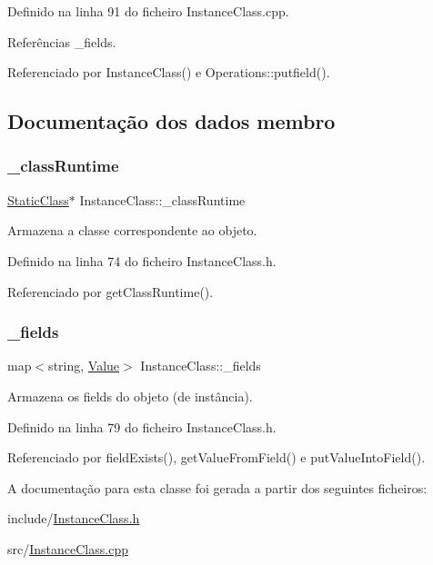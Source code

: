 Definido na linha 91 do ficheiro Instance\+Class.\+cpp.



Referências \+\_\+fields.



Referenciado por Instance\+Class() e Operations\+::putfield().



\subsection{Documentação dos dados membro}
\mbox{\label{classInstanceClass_aa8ed961b694f26f470dc2399532d3538}} 
\subsubsection{\texorpdfstring{\+\_\+class\+Runtime}{\_classRuntime}}
{\footnotesize\ttfamily \hyperlink{classStaticClass}{Static\+Class}$\ast$ Instance\+Class\+::\+\_\+class\+Runtime\hspace{0.3cm}{\ttfamily [private]}}

Armazena a classe correspondente ao objeto. 

Definido na linha 74 do ficheiro Instance\+Class.\+h.



Referenciado por get\+Class\+Runtime().

\mbox{\label{classInstanceClass_a603a0866f5113d16ff8f80b5d6bf152b}} 
\subsubsection{\texorpdfstring{\+\_\+fields}{\_fields}}
{\footnotesize\ttfamily map$<$string, \hyperlink{structValue}{Value}$>$ Instance\+Class\+::\+\_\+fields\hspace{0.3cm}{\ttfamily [private]}}

Armazena os fields do objeto (de instância). 

Definido na linha 79 do ficheiro Instance\+Class.\+h.



Referenciado por field\+Exists(), get\+Value\+From\+Field() e put\+Value\+Into\+Field().



A documentação para esta classe foi gerada a partir dos seguintes ficheiros\+:\begin{DoxyCompactItemize}
\item 
include/\hyperlink{InstanceClass_8h}{Instance\+Class.\+h}\item 
src/\hyperlink{InstanceClass_8cpp}{Instance\+Class.\+cpp}\end{DoxyCompactItemize}
